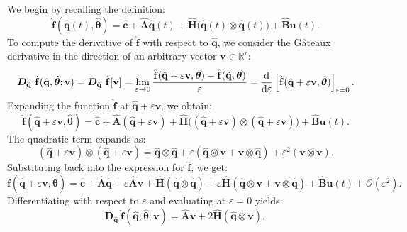 We begin by recalling the definition:\\
$$
\hat{\mathbf{f}}(\hat{\mathbf{q}}(t), \hat{\bm{\theta}}) = \hat{\mathbf{c}} + \hat{\mathbf{A}}\hat{\mathbf{q}}(t) + \hat{\mathbf{H}}\bigl( \hat{\mathbf{q}}(t)\otimes \hat{\mathbf{q}}(t) \bigr) + \hat{\mathbf{B}}\mathbf{u}(t).
$$
To compute the derivative of $\hat{\mathbf{f}}$ with respect to $\hat{\mathbf{q}}$, we consider the Gâteaux derivative in the direction of an arbitrary vector $\mathbf{v}\in \mathbb{R}^r$:\\
$$
\bm{D}_{\hat{\mathbf{q}}}~\hat{\mathbf{f}}(\hat{\mathbf{q}}, \hat{\bm{\theta}}; \mathbf{v}) = \bm{D}_{\hat{\mathbf{q}}}~\hat{\mathbf{f}}[\mathbf{v}] = \lim_{\varepsilon \to 0} \frac{\hat{\mathbf{f}}(\hat{\mathbf{q}} + \varepsilon \mathbf{v}, \hat{\bm{\theta}}) - \hat{\mathbf{f}}(\hat{\mathbf{q}}, \hat{\bm{\theta}})}{\varepsilon} = \dv{}{\varepsilon} \left[ \hat{\mathbf{f}}(\hat{\mathbf{q}} + \varepsilon \mathbf{v}, \hat{\bm{\theta}}) \right]_{\varepsilon = 0}.
$$
Expanding the function $\hat{\mathbf{f}}$ at $\hat{\mathbf{q}} + \varepsilon \mathbf{v}$, we obtain:\\
$$
\hat{\mathbf{f}}(\hat{\mathbf{q}} + \varepsilon \mathbf{v}, \hat{\bm{\theta}}) = \hat{\mathbf{c}} + \hat{\mathbf{A}}(\hat{\mathbf{q}} + \varepsilon \mathbf{v}) + \hat{\mathbf{H}}\bigl( (\hat{\mathbf{q}} + \varepsilon \mathbf{v}) \otimes (\hat{\mathbf{q}} + \varepsilon \mathbf{v}) \bigr) + \hat{\mathbf{B}}\mathbf{u}(t).
$$
The quadratic term expands as:\\
$$
(\hat{\mathbf{q}} + \varepsilon \mathbf{v}) \otimes (\hat{\mathbf{q}} + \varepsilon \mathbf{v}) = \hat{\mathbf{q}} \otimes \hat{\mathbf{q}} + \varepsilon (\hat{\mathbf{q}} \otimes \mathbf{v} + \mathbf{v} \otimes \hat{\mathbf{q}}) + \varepsilon^2 (\mathbf{v} \otimes \mathbf{v}).
$$
Substituting back into the expression for $\hat{\mathbf{f}}$, we get:\\
$$
\hat{\mathbf{f}}(\hat{\mathbf{q}} + \varepsilon \mathbf{v}, \hat{\bm{\theta}}) = \hat{\mathbf{c}} + \hat{\mathbf{A}}\hat{\mathbf{q}} + \varepsilon \hat{\mathbf{A}}\mathbf{v} + \hat{\mathbf{H}}(\hat{\mathbf{q}} \otimes \hat{\mathbf{q}}) + \varepsilon \hat{\mathbf{H}}(\hat{\mathbf{q}} \otimes \mathbf{v} + \mathbf{v} \otimes \hat{\mathbf{q}}) + \hat{\mathbf{B}}\mathbf{u}(t) + \mathcal{O}(\varepsilon^2).
$$
Differentiating with respect to $\varepsilon$ and evaluating at $\varepsilon = 0$ yields:\\
$$
\bm{D}_{\hat{\mathbf{q}}}~\hat{\mathbf{f}}(\hat{\mathbf{q}},\hat{\bm{\theta}};\mathbf{v}) = \hat{\mathbf{A}}\mathbf{v} + 2\hat{\mathbf{H}}(\hat{\mathbf{q}} \otimes \mathbf{v}),
$$
